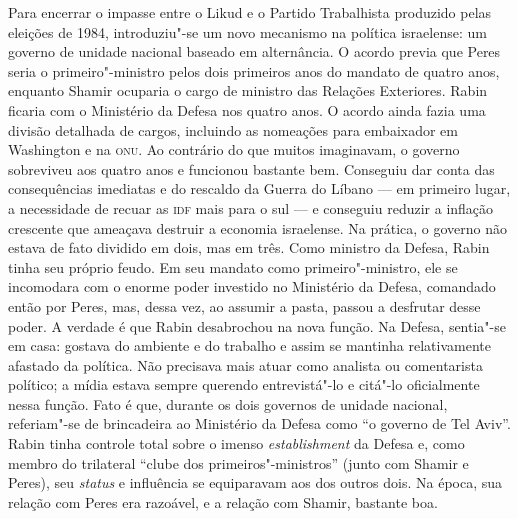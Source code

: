 Para encerrar o impasse entre o Likud e o Partido Trabalhista produzido
pelas eleições de 1984, introduziu"-se um novo mecanismo na política
israelense: um governo de unidade nacional baseado em alternância. O
acordo previa que Peres seria o primeiro"-ministro pelos dois primeiros anos
do mandato de quatro anos, enquanto Shamir ocuparia o cargo de ministro
das Relações Exteriores. Rabin ficaria com o Ministério da Defesa nos
quatro anos. O acordo ainda fazia uma divisão detalhada de cargos,
incluindo as nomeações para embaixador em Washington e na \textsc{onu}. Ao
contrário do que muitos imaginavam, o governo sobreviveu aos quatro anos
e funcionou bastante bem. Conseguiu dar conta das consequências
imediatas e do rescaldo da Guerra do Líbano --- em primeiro lugar, a
necessidade de recuar as \textsc{idf} mais para o sul --- e conseguiu reduzir a
inflação crescente que ameaçava destruir a economia israelense. Na
prática, o governo não estava de fato dividido em dois, mas em três.
Como ministro da Defesa, Rabin tinha seu próprio feudo. Em seu mandato
como primeiro"-ministro, ele se incomodara com o enorme poder investido
no Ministério da Defesa, comandado então por Peres, mas, dessa vez,
ao assumir a pasta, passou a desfrutar desse poder.
A verdade é que Rabin desabrochou na nova função. Na Defesa, sentia"-se
em casa: gostava do ambiente e do trabalho e assim se mantinha
relativamente afastado da política. Não precisava mais atuar como
analista ou comentarista político; a mídia estava sempre querendo
entrevistá"-lo e citá"-lo oficialmente nessa função. Fato é que, durante os
dois governos de unidade nacional, referiam"-se de brincadeira ao
Ministério da Defesa como ``o governo de Tel Aviv''. Rabin tinha
controle total sobre o imenso \emph{establishment} da Defesa e, como
membro do trilateral ``clube dos primeiros"-ministros'' (junto com Shamir
e Peres), seu \emph{status} e influência se equiparavam aos dos outros dois. Na
época, sua relação com Peres era razoável, e a relação com Shamir,
bastante boa.

